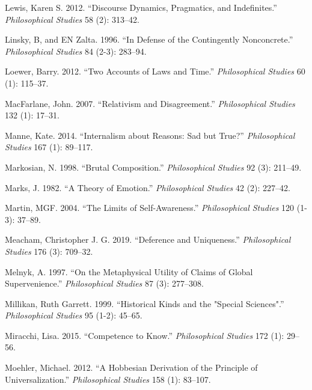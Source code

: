 \documentclass[
  10pt,
  letterpaper,
  DIV=11,
  numbers=noendperiod,
  twoside]{scrartcl}
\newlength{\cslhangindent}
\newenvironment{CSLReferences}[2] %
 {\begin{list}{}{%
  \setlength{\itemindent}{0pt}
  \setlength{\leftmargin}{0pt}
  \setlength{\parsep}{0pt}
  \ifodd #1
   \setlength{\leftmargin}{\cslhangindent}
   \setlength{\itemindent}{-1\cslhangindent}
  \fi
  \setlength{\itemsep}{#2\baselineskip}}}
 {\end{list}}
\begin{document}
\begin{CSLReferences}{1}{0}
Lewis, Karen S. 2012. {``Discourse Dynamics, Pragmatics, and
Indefinites.''} \emph{Philosophical Studies} 58 (2): 313--42.

Linsky, B, and EN Zalta. 1996. {``In Defense of the Contingently
Nonconcrete.''} \emph{Philosophical Studies} 84 (2-3): 283--94.

Loewer, Barry. 2012. {``Two Accounts of Laws and Time.''}
\emph{Philosophical Studies} 60 (1): 115--37.

MacFarlane, John. 2007. {``Relativism and Disagreement.''}
\emph{Philosophical Studies} 132 (1): 17--31.

Manne, Kate. 2014. {``Internalism about Reasons: Sad but True?''}
\emph{Philosophical Studies} 167 (1): 89--117.

Markosian, N. 1998. {``Brutal Composition.''} \emph{Philosophical
Studies} 92 (3): 211--49.

Marks, J. 1982. {``A Theory of Emotion.''} \emph{Philosophical Studies}
42 (2): 227--42.

Martin, MGF. 2004. {``The Limits of Self-Awareness.''}
\emph{Philosophical Studies} 120 (1-3): 37--89.

Meacham, Christopher J. G. 2019. {``Deference and Uniqueness.''}
\emph{Philosophical Studies} 176 (3): 709--32.

Melnyk, A. 1997. {``On the Metaphysical Utility of Claims of Global
Supervenience.''} \emph{Philosophical Studies} 87 (3): 277--308.

Millikan, Ruth Garrett. 1999. {``Historical Kinds and the "Special
Sciences".''} \emph{Philosophical Studies} 95 (1-2): 45--65.

Miracchi, Lisa. 2015. {``Competence to Know.''} \emph{Philosophical
Studies} 172 (1): 29--56.

Moehler, Michael. 2012. {``A Hobbesian Derivation of the Principle of
Universalization.''} \emph{Philosophical Studies} 158 (1): 83--107.


\end{CSLReferences}
\end{document}
